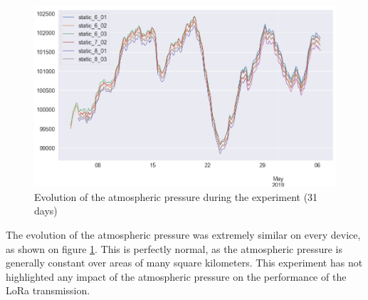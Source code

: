 \documentclass[letterpaper, 10 pt, conference]{ieeeconf}  %
\begin{document}
\begin{figure}[htbp]
\centering
\includegraphics[scale=0.245]{pressure_general.png}
\caption{Evolution of the atmospheric pressure during the experiment (31 days)}
\label{pressure_general}
\end{figure}

The evolution of the atmospheric pressure was extremely similar on every device, as shown on figure \ref{pressure_general}. This is perfectly normal, as the atmospheric pressure is generally constant over areas of many square kilometers. This experiment has not highlighted any impact of the atmospheric pressure on the performance of the LoRa transmission.


 

\end{document}
